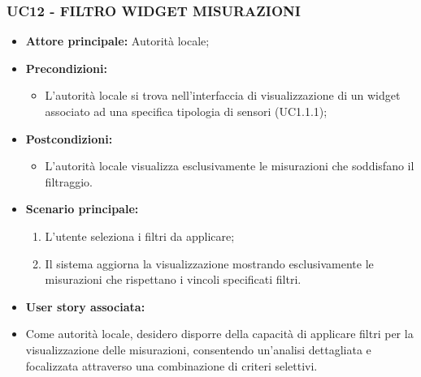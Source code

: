 \subsubsection{UC12 - FILTRO WIDGET MISURAZIONI}
\begin{itemize}
    \item \textbf{Attore principale:} Autorità locale;
    \item \textbf{Precondizioni:}
        \begin{itemize}
            \item L'autorità locale si trova nell'interfaccia di visualizzazione di un widget associato ad una specifica tipologia di sensori (UC1.1.1);
        \end{itemize}
    \item \textbf{Postcondizioni:}
          \begin{itemize}
              \item L'autorità locale visualizza esclusivamente le misurazioni che soddisfano il filtraggio.
          \end{itemize}
    \item \textbf{Scenario principale:}
          \begin{enumerate}
              \item L'utente seleziona i filtri da applicare;
              \item Il sistema aggiorna la visualizzazione mostrando esclusivamente le misurazioni che rispettano i vincoli specificati filtri.
          \end{enumerate}
    \item \textbf{User story associata:} \\
            \item Come autorità locale, desidero disporre della capacità di applicare filtri per la visualizzazione delle misurazioni, consentendo un'analisi dettagliata e focalizzata attraverso una combinazione di criteri selettivi.
\end{itemize}
